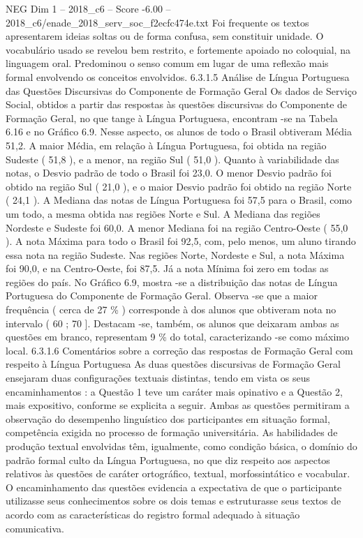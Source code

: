 \begin{textsample}{NEG Dim 1 – 2018\_c6 – Score -6.00 – 2018\_c6/enade\_2018\_serv\_soc\_f2ecfc474e.txt}
Foi frequente os textos apresentarem ideias soltas ou de forma confusa, sem constituir unidade.
O vocabulário usado se revelou bem restrito, e fortemente apoiado no coloquial, na linguagem oral.
Predominou o senso comum em lugar de uma reflexão mais formal envolvendo os conceitos envolvidos. 6.3.1.5 Análise de Língua Portuguesa das Questões Discursivas do Componente de Formação Geral Os dados de Serviço Social, obtidos a partir das respostas às questões discursivas do Componente de Formação Geral, no que tange à Língua Portuguesa, encontram -se na Tabela 6.16 e no Gráfico 6.9.
Nesse aspecto, os alunos de todo o Brasil obtiveram Média 51,2.
A maior Média, em relação à Língua Portuguesa, foi obtida na região Sudeste ( 51,8 ), e a menor, na região Sul ( 51,0 ).
Quanto à variabilidade das notas, o Desvio padrão de todo o Brasil foi 23,0.
O menor Desvio padrão foi obtido na região Sul ( 21,0 ), e o maior Desvio padrão foi obtido na região Norte ( 24,1 ).
A Mediana das notas de Língua Portuguesa foi 57,5 para o Brasil, como um todo, a mesma obtida nas regiões Norte e Sul.
A Mediana das regiões Nordeste e Sudeste foi 60,0.
A menor Mediana foi na região Centro-Oeste ( 55,0 ).
A nota Máxima para todo o Brasil foi 92,5, com, pelo menos, um aluno tirando essa nota na região Sudeste.
Nas regiões Norte, Nordeste e Sul, a nota Máxima foi 90,0, e na Centro-Oeste, foi 87,5.
Já a nota Mínima foi zero em todas as regiões do país.
No Gráfico 6.9, mostra -se a distribuição das notas de Língua Portuguesa do Componente de Formação Geral.
Observa -se que a maior frequência ( cerca de 27 \% ) corresponde à dos alunos que obtiveram nota no intervalo ( 60 ; 70 ].
Destacam -se, também, os alunos que deixaram ambas as questões em branco, representam 9 \% do total, caracterizando -se como máximo local. 6.3.1.6 Comentários sobre a correção das respostas de Formação Geral com respeito à Língua Portuguesa As duas questões discursivas de Formação Geral ensejaram duas configurações textuais distintas, tendo em vista os seus encaminhamentos : a Questão 1 teve um caráter mais opinativo e a Questão 2, mais expositivo, conforme se explicita a seguir.
Ambas as questões permitiram a observação do desempenho linguístico dos participantes em situação formal, competência exigida no processo de formação universitária.
As habilidades de produção textual envolvidas têm, igualmente, como condição básica, o domínio do padrão formal culto da Língua Portuguesa, no que diz respeito aos aspectos relativos às questões de caráter ortográfico, textual, morfossintático e vocabular.
O encaminhamento das questões evidencia a expectativa de que o participante utilizasse seus conhecimentos sobre os dois temas e estruturasse seus textos de acordo com as características do registro formal adequado à situação comunicativa.

\end{textsample}
